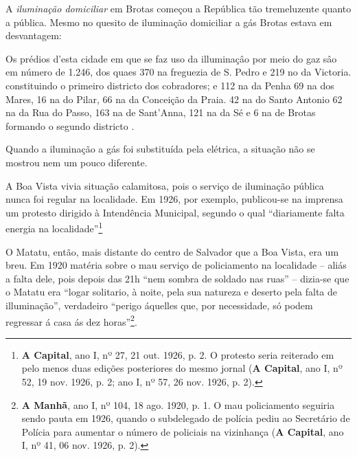 A \textit{iluminação domiciliar} em Brotas começou a República tão tremeluzente quanto a pública. Mesmo no quesito de iluminação domiciliar a gás Brotas estava em desvantagem:

\begin{citacao}
Os prédios d'esta cidade em que se faz uso da illuminaçâo por meio do gaz sâo em número de 1.246, dos quaes 370 na freguezia de S. Pedro e 219 no da Victoria. constituindo o primeiro districto dos cobradores; e 112 na da Penha 69 na dos Mares, 16 na do Pilar, 66 na da Conceição da Praia. 42 na do Santo Antonio 62 na da Rua do Passo, 163 na de Sant'Anna, 121 na da Sé e 6 na de Brotas formando o segundo districto \cite[p.~151]{salvador_relatorio_1895}. 
\end{citacao}

Quando a iluminação a gás foi substituída pela elétrica, a situação não se mostrou nem um pouco diferente.

A Boa Vista vivia situação calamitosa, pois o serviço de iluminação pública nunca foi regular na localidade. Em 1926, por exemplo, publicou-se na imprensa um protesto dirigido à Intendência Municipal, segundo o qual ``diariamente falta energia na localidade''\footnote{\textbf{A Capital}, ano I, nº 27, 21 out. 1926, p. 2. O protesto seria reiterado em pelo menos duas edições posteriores do mesmo jornal (\textbf{A Capital}, ano I, nº 52, 19 nov. 1926, p. 2; ano I, nº 57, 26 nov. 1926, p. 2).}

O Matatu, então, mais distante do centro de Salvador que a Boa Vista, era um breu. Em 1920 matéria sobre o mau serviço de policiamento na localidade -- aliás a falta dele, pois depois das 21h ``nem sombra de soldado nas ruas'' -- dizia-se que o Matatu era ``logar solitario, à noite, pela sua natureza e deserto pela falta de illuminação'', verdadeiro ``perigo áquelles que, por necessidade, só podem regressar á casa ás dez horas''\footnote{\textbf{A Manhã}, ano I, nº 104, 18 ago. 1920, p. 1. O mau policiamento seguiria sendo pauta em 1926, quando o subdelegado de polícia pediu ao Secretário de Polícia para aumentar o número de policiais na vizinhança (\textbf{A Capital}, ano I, nº 41, 06 nov. 1926, p. 2).}.

